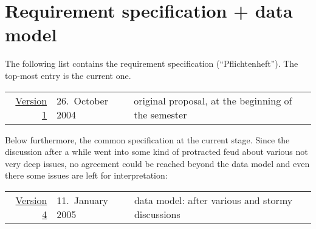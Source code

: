 
\section*{Requirement specification + data model}
\label{sec:requirementspecification}

The following list contains the requirement specification
(``Pflichtenheft'').  The top-most entry is the current one.

\begin{center}
  \begin{tabular}[t]{r@{\quad}l@{\quad\quad}l@{\quad\quad}p{9cm}}
    \href{requirements/v1}{Version 1}
    &
    26.\ October 2004
    & 
    original proposal, at the beginning of the semester
  \end{tabular}
\end{center}


Below furthermore, the common specification at the current stage. Since the
discussion after a while went into some kind of protracted feud about
various not very deep issues, no agreement could be reached beyond the data
model and even there some issues are left for interpretation:

\begin{center}
  \begin{tabular}[t]{r@{\quad}l@{\quad\quad}l@{\quad\quad}p{9cm}}
    \href{spec/v4}{Version 4}
    &
    11.\ January  2005
    & 
    data model: after various and stormy discussions
  \end{tabular}
\end{center}









